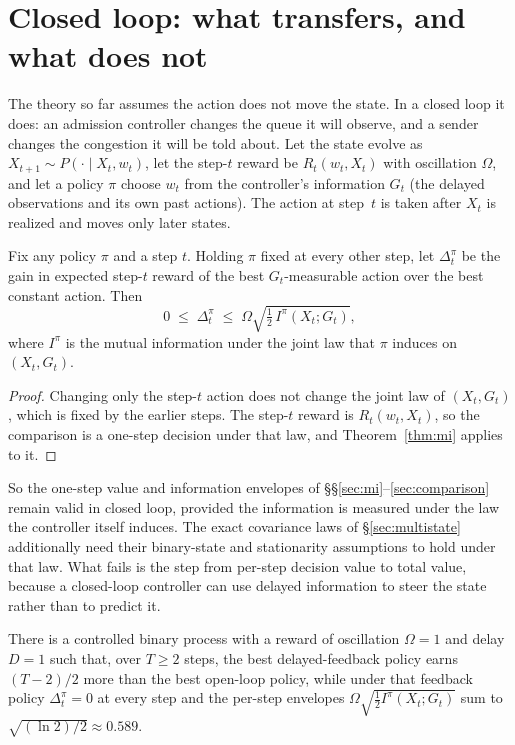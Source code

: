 \documentclass[acmsmall,screen,review,anonymous]{acmart}
\begin{document}
\section{Closed loop: what transfers, and what does not}\label{sec:closedloop}

The theory so far assumes the action does not move the state. In a
closed loop it does: an admission controller changes the queue it will
observe, and a sender changes the congestion it will be told about. Let the
state evolve as $X_{t+1}\sim P(\cdot\mid X_t,w_t)$, let the step-$t$ reward be
$R_t(w_t,X_t)$ with oscillation $\Omega$, and let a policy $\pi$ choose $w_t$ from
the controller's information $G_t$ (the delayed observations and its own
past actions). The action at step~$t$ is taken after $X_t$ is realized and
moves only later states.

\begin{proposition}\label{prop:clstep}
Fix any policy $\pi$ and a step $t$. Holding $\pi$ fixed at every other step, let
$\Delta^\pi_t$ be the gain in expected step-$t$ reward of the best
$G_t$-measurable action over the best constant action. Then
\[
0\;\le\;\Delta^\pi_t\;\le\;\Omega\sqrt{\tfrac12\,I^\pi(X_t;G_t)},
\]
where $I^\pi$ is the mutual information under the joint law that $\pi$
induces on $(X_t,G_t)$.
\end{proposition}

\begin{proof}
Changing only the step-$t$ action does not change the joint law of
$(X_t,G_t)$, which is fixed by the earlier steps. The step-$t$ reward is
$R_t(w_t,X_t)$, so the comparison is a one-step decision under that law,
and Theorem~\ref{thm:mi} applies to it.
\end{proof}

So the one-step value and information envelopes of \S\S\ref{sec:mi}--\ref{sec:comparison}
remain valid in closed loop, provided the information is measured under
the law the controller itself induces. The exact covariance laws of
\S\ref{sec:multistate} additionally need their binary-state and
stationarity assumptions to hold under that law. What fails is the step from per-step decision
value to total value, because a closed-loop controller can use delayed
information to steer the state rather than to predict it.

\begin{proposition}\label{prop:clsteer}
There is a controlled binary process with a reward of oscillation
$\Omega=1$ and delay $D=1$ such that, over $T\ge2$ steps, the best delayed-feedback
policy earns $(T-2)/2$ more than the best open-loop policy, while under that
feedback policy $\Delta^\pi_t=0$ at every step and the per-step envelopes
$\Omega\sqrt{\tfrac12 I^\pi(X_t;G_t)}$ sum to $\sqrt{(\ln 2)/2}\approx0.589$.
\end{proposition}
\end{document}
